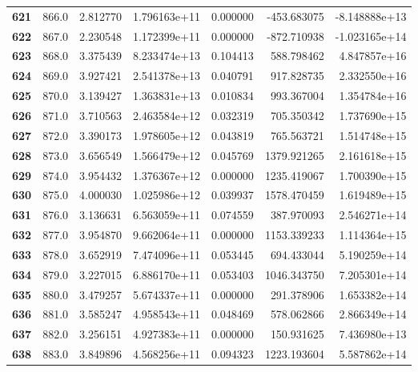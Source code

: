 \documentclass{report}[12pt]
\begin{document}
\begin{center}
\begin{tabular}{lrrrrrr}
\textbf{621 } &          866.0 &   2.812770 &  1.796163e+11 &    0.000000 &  -453.683075 & -8.148888e+13 \\
\textbf{622 } &          867.0 &   2.230548 &  1.172399e+11 &    0.000000 &  -872.710938 & -1.023165e+14 \\
\textbf{623 } &          868.0 &   3.375439 &  8.233474e+13 &    0.104413 &   588.798462 &  4.847857e+16 \\
\textbf{624 } &          869.0 &   3.927421 &  2.541378e+13 &    0.040791 &   917.828735 &  2.332550e+16 \\
\textbf{625 } &          870.0 &   3.139427 &  1.363831e+13 &    0.010834 &   993.367004 &  1.354784e+16 \\
\textbf{626 } &          871.0 &   3.710563 &  2.463584e+12 &    0.032319 &   705.350342 &  1.737690e+15 \\
\textbf{627 } &          872.0 &   3.390173 &  1.978605e+12 &    0.043819 &   765.563721 &  1.514748e+15 \\
\textbf{628 } &          873.0 &   3.656549 &  1.566479e+12 &    0.045769 &  1379.921265 &  2.161618e+15 \\
\textbf{629 } &          874.0 &   3.954432 &  1.376367e+12 &    0.000000 &  1235.419067 &  1.700390e+15 \\
\textbf{630 } &          875.0 &   4.000030 &  1.025986e+12 &    0.039937 &  1578.470459 &  1.619489e+15 \\
\textbf{631 } &          876.0 &   3.136631 &  6.563059e+11 &    0.074559 &   387.970093 &  2.546271e+14 \\
\textbf{632 } &          877.0 &   3.954870 &  9.662064e+11 &    0.000000 &  1153.339233 &  1.114364e+15 \\
\textbf{633 } &          878.0 &   3.652919 &  7.474096e+11 &    0.053445 &   694.433044 &  5.190259e+14 \\
\textbf{634 } &          879.0 &   3.227015 &  6.886170e+11 &    0.053403 &  1046.343750 &  7.205301e+14 \\
\textbf{635 } &          880.0 &   3.479257 &  5.674337e+11 &    0.000000 &   291.378906 &  1.653382e+14 \\
\textbf{636 } &          881.0 &   3.585247 &  4.958543e+11 &    0.048469 &   578.062866 &  2.866349e+14 \\
\textbf{637 } &          882.0 &   3.256151 &  4.927383e+11 &    0.000000 &   150.931625 &  7.436980e+13 \\
\textbf{638 } &          883.0 &   3.849896 &  4.568256e+11 &    0.094323 &  1223.193604 &  5.587862e+14 \\

\end{tabular}
\end{center}
\end{document}
